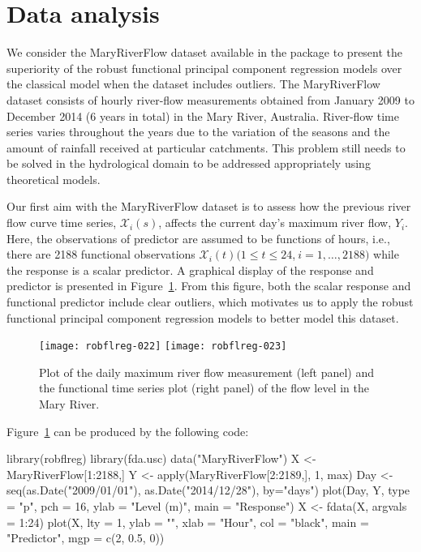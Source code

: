 \section*{Data analysis}

We consider the MaryRiverFlow dataset available in the  package to present the superiority of the robust functional principal component regression models over the classical model when the dataset includes outliers. The MaryRiverFlow dataset consists of hourly river-flow measurements obtained from January 2009 to December 2014 (6 years in total) in the Mary River, Australia. River-flow time series varies throughout the years due to the variation of the seasons and the amount of rainfall received at particular catchments. This problem still needs to be solved in the hydrological domain to be addressed appropriately using theoretical models.

Our first aim with the MaryRiverFlow dataset is to assess how the previous river flow curve time series, $\mathcal{X}_i(s)$, affects the current day's maximum river flow, $Y_i$. Here, the observations of predictor are assumed to be functions of hours, i.e., there are 2188 functional observations $\mathcal{X}_i(t) \big(1\leq t\leq 24$,$~ i=1, \ldots, 2188 \big)$ while the response is a scalar predictor. A graphical display of the response and predictor is presented in Figure~\ref{fig:7}. From this figure, both the scalar response and functional predictor include clear outliers, which motivates us to apply the robust functional principal component regression models to better model this dataset.

\begin{figure}[!htb]
  \begin{center}
\texttt{[image: robflreg-022]}
\texttt{[image: robflreg-023]}
\end{center}
\caption{Plot of the daily maximum river flow measurement (left panel) and the functional time series plot (right panel) of the flow level in the Mary River.}\label{fig:7}
\end{figure}

Figure~\ref{fig:7} can be produced by the following code:
\begin{smallexample}
\begin{smallverbatim}
library(robflreg)
library(fda.usc)
data("MaryRiverFlow")
X <- MaryRiverFlow[1:2188,]
Y <- apply(MaryRiverFlow[2:2189,], 1, max)
Day <- seq(as.Date("2009/01/01"), as.Date("2014/12/28"), by="days")
plot(Day, Y, type = "p", pch = 16, ylab = "Level (m)", main = "Response")
X <- fdata(X, argvals = 1:24)
plot(X, lty = 1, ylab = "", xlab = "Hour", col = "black",
     main = "Predictor", mgp = c(2, 0.5, 0))
\end{smallverbatim}
\end{smallexample}

